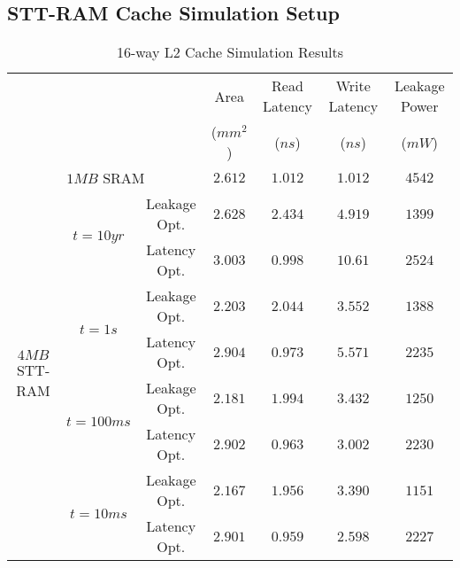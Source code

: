 \subsection{STT-RAM Cache Simulation Setup}

\begin{table*}[t]
  \centering
  \caption{16-way L2 Cache Simulation Results}
  \label{allcaches}
  \begin{tabular}{| c | c | c  | c | c | c | c |}
  	\hline\hline
  	\multirow{2}{*}{} & \multirow{2}{*}{} & \multirow{2}{*}{} & Area  & Read Latency & Write Latency & Leakage Power\\
  & & & ($mm^2$) & ($ns$) & ($ns$) & ($mW$) \\
  	\hline\hline
  	\multicolumn{3}{|c|}{$1MB$ SRAM} & $2.612$ & $1.012$ & $1.012$ & $4542$ \\
  	\hline
  	\multirow{8}{*}{$4MB$ STT-RAM} & \multirow{2}{*}{$t=10yr$} & Leakage Opt.& $2.628$ & $2.434$ & $4.919$ & $1399$ \\
  	\cline{3-3}\cline{4-7}
  	& & Latency Opt. & $3.003$ & $0.998$ & $10.61$ & $2524$ \\
  	\cline{2-3}\cline{4-7}
  	& \multirow{2}{*}{$t=1s$} & Leakage Opt. & $2.203$ & $2.044$ & $3.552$ & $1388$ \\
  	\cline{3-3}\cline{4-7}
  	& & Latency Opt. & $2.904$ & $0.973$ & $5.571$ & $2235$ \\
  	\cline{2-3}\cline{4-7}
    & \multirow{2}{*}{$t=100ms$} & Leakage Opt. & $2.181$ & $1.994$ & $3.432$ & $1250$ \\
  	\cline{3-3}\cline{4-7}
  	& & Latency Opt. & $2.902$ & $0.963$ & $3.002$ & $2230$ \\
  	\cline{2-3}\cline{4-7}
  	& \multirow{2}{*}{$t=10ms$} & Leakage Opt. & $2.167$ & $1.956$ & $3.390$ & $1151$ \\
  	\cline{3-3}\cline{4-7}
  	& & Latency Opt. & $2.901$ & $0.959$ & $2.598$ & $2227$ \\	
  	\hline\hline
  \end{tabular}
\end{table*}

